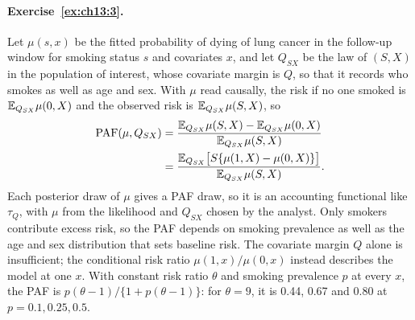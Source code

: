 \paragraph{Exercise~\ref{ex:ch13:3}.} Let $\mu(s, x)$ be the fitted probability of dying of lung cancer in the follow-up window for smoking status $s$ and covariates $x$, and let $Q_{SX}$ be the law of $(S, X)$ in the population of interest, whose covariate margin is $Q$, so that it records who smokes as well as age and sex. With $\mu$ read causally, the risk if no one smoked is $\mathbb{E}_{Q_{SX}}\mu(0, X)$ and the observed risk is $\mathbb{E}_{Q_{SX}}\mu(S, X)$, so
\begin{align*}
\mathrm{PAF}(\mu, Q_{SX}) &= \frac{\mathbb{E}_{Q_{SX}}\mu(S, X) - \mathbb{E}_{Q_{SX}}\mu(0, X)}{\mathbb{E}_{Q_{SX}}\mu(S, X)} \\
&= \frac{\mathbb{E}_{Q_{SX}}\bigl[S\{\mu(1, X) - \mu(0, X)\}\bigr]}{\mathbb{E}_{Q_{SX}}\mu(S, X)}.
\end{align*}
Each posterior draw of $\mu$ gives a PAF draw, so it is an accounting functional like $\tau_Q$, with $\mu$ from the likelihood and $Q_{SX}$ chosen by the analyst. Only smokers contribute excess risk, so the PAF depends on smoking prevalence as well as the age and sex distribution that sets baseline risk. The covariate margin $Q$ alone is insufficient; the conditional risk ratio $\mu(1,x)/\mu(0,x)$ instead describes the model at one $x$. With constant risk ratio $\theta$ and smoking prevalence $p$ at every $x$, the PAF is $p(\theta - 1)/\{1 + p(\theta - 1)\}$: for $\theta = 9$, it is 0.44, 0.67 and 0.80 at $p = 0.1, 0.25, 0.5$.

